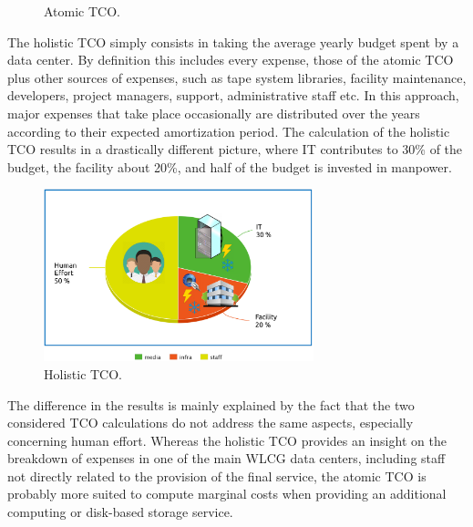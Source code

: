 \begin{figure}[h]
    \caption{Atomic TCO.}
    \label{fig:tco:atomic}
\end{figure}



The holistic TCO simply consists in taking the average yearly budget
spent by a data center.  By definition this includes every expense,
those of the atomic TCO plus other sources of expenses, such as tape
system libraries, facility maintenance, developers, project managers, support,
administrative staff etc.  In this approach, major expenses that take
place occasionally are distributed over the years according to their
expected amortization period.  The calculation of the holistic TCO
results in a drastically different picture, where IT contributes to
30\% of the budget, the facility about 20\%, and half of the budget
is invested in manpower.

\begin{figure}[h]
    \centering
    \includegraphics[height=5cm]{holistic_tco.png}
    \caption{Holistic TCO.}
    \label{fig:tco:holistic}
\end{figure}


The difference in the results is mainly explained by the fact that the
two considered TCO calculations do not address the same aspects,
especially concerning human effort. Whereas the holistic TCO provides
an insight on the breakdown of expenses in one of the main WLCG data
centers, including staff not directly related to the provision of the
final service, the atomic TCO is probably more suited to compute
marginal costs when providing an additional computing or disk-based
storage service.



